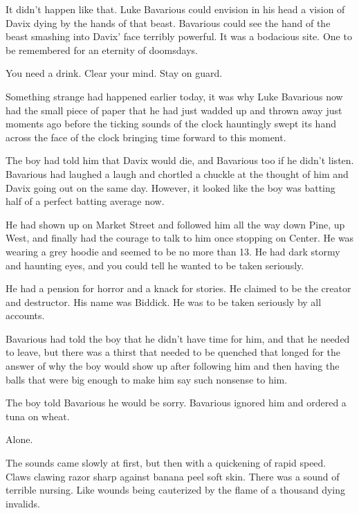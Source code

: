 It didn't happen like that. Luke Bavarious could envision in
his head a vision of Davix dying by the hands of that beast.
Bavarious could see the hand of the beast smashing into
Davix' face terribly powerful. It was a bodacious site. One
to be remembered for an eternity of doomsdays.



You need a drink. Clear your mind. Stay on guard.



Something strange had happened earlier today, it was why Luke
Bavarious now had the small piece of paper that he had just wadded
up and thrown away just moments ago before the ticking sounds of
the clock hauntingly swept its hand across the face of the clock
bringing time forward to this moment.



The boy had told him that Davix would die, and Bavarious too if he
didn't listen. Bavarious had laughed a laugh and chortled a
chuckle at the thought of him and Davix going out on the same day.
However, it looked like the boy was batting half of a perfect
batting average now.



He had shown up on Market Street and followed him all the way down
Pine, up West, and finally had the courage to talk to him once
stopping on Center. He was wearing a grey hoodie and seemed to be
no more than 13. He had dark stormy and haunting eyes, and you
could tell he wanted to be taken seriously.



He had a pension for horror and a knack for stories. He claimed to
be the creator and destructor. His name was Biddick. He was to be
taken seriously by all accounts.



Bavarious had told the boy that he didn't have time for him,
and that he needed to leave, but there was a thirst that needed to
be quenched that longed for the answer of why the boy would show up
after following him and then having the balls that were big enough
to make him say such nonsense to him.



The boy told Bavarious he would be sorry. Bavarious ignored him and
ordered a tuna on wheat.





Alone.



The sounds came slowly at first, but then with a quickening of
rapid speed. Claws clawing razor sharp against banana peel soft
skin. There was a sound of terrible nursing. Like wounds being
cauterized by the flame of a thousand dying invalids.



